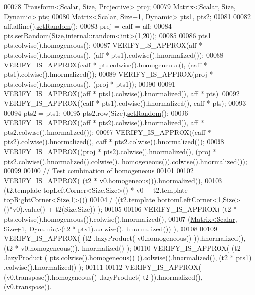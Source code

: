 \begin{DoxyCode}
00078   \hyperlink{group___geometry___module_class_eigen_1_1_transform}{Transform<Scalar, Size, Projective>} proj;
00079   \hyperlink{group___core___module_class_eigen_1_1_matrix}{Matrix<Scalar, Size, Dynamic>}   pts;
00080   \hyperlink{group___core___module_class_eigen_1_1_matrix}{Matrix<Scalar, Size+1, Dynamic>} pts1, pts2;
00081 
00082   aff.affine().\hyperlink{class_eigen_1_1_plain_object_base_af0e576a0e1aefc9ee346de44cc352ba3}{setRandom}();
00083   proj = caff = aff;
00084   pts.\hyperlink{class_eigen_1_1_plain_object_base_af0e576a0e1aefc9ee346de44cc352ba3}{setRandom}(Size,internal::random<int>(1,20));
00085   
00086   pts1 = pts.colwise().homogeneous();
00087   VERIFY\_IS\_APPROX(aff  * pts.colwise().homogeneous(), (aff  * pts1).colwise().hnormalized());
00088   VERIFY\_IS\_APPROX(caff * pts.colwise().homogeneous(), (caff * pts1).colwise().hnormalized());
00089   VERIFY\_IS\_APPROX(proj * pts.colwise().homogeneous(), (proj * pts1));
00090 
00091   VERIFY\_IS\_APPROX((aff  * pts1).colwise().hnormalized(),  aff  * pts);
00092   VERIFY\_IS\_APPROX((caff * pts1).colwise().hnormalized(), caff * pts);
00093   
00094   pts2 = pts1;
00095   pts2.row(Size).\hyperlink{class_eigen_1_1_plain_object_base_af0e576a0e1aefc9ee346de44cc352ba3}{setRandom}();
00096   VERIFY\_IS\_APPROX((aff  * pts2).colwise().hnormalized(), aff  * pts2.colwise().hnormalized());
00097   VERIFY\_IS\_APPROX((caff * pts2).colwise().hnormalized(), caff * pts2.colwise().hnormalized());
00098   VERIFY\_IS\_APPROX((proj * pts2).colwise().hnormalized(), (proj * pts2.colwise().hnormalized().colwise().
      homogeneous()).colwise().hnormalized());
00099   
00100   \textcolor{comment}{// Test combination of homogeneous}
00101   
00102   VERIFY\_IS\_APPROX( (t2 * v0.homogeneous()).hnormalized(),
00103                        (t2.template topLeftCorner<Size,Size>() * v0 + t2.template topRightCorner<Size,1>())
00104                      / ((t2.template bottomLeftCorner<1,Size>()*v0).value() + t2(Size,Size)) );
00105   
00106   VERIFY\_IS\_APPROX( (t2 * pts.colwise().homogeneous()).colwise().hnormalized(),
00107                     (\hyperlink{group___core___module_class_eigen_1_1_matrix}{Matrix<Scalar, Size+1, Dynamic>}(t2 * pts1).colwise().
      hnormalized()) );
00108   
00109   VERIFY\_IS\_APPROX( (t2 .lazyProduct( v0.homogeneous() )).hnormalized(), (t2 * v0.homogeneous()).
      hnormalized() );
00110   VERIFY\_IS\_APPROX( (t2 .lazyProduct  ( pts.colwise().homogeneous() )).colwise().hnormalized(), (t2 * pts1)
      .colwise().hnormalized() );
00111   
00112   VERIFY\_IS\_APPROX( (v0.transpose().homogeneous() .lazyProduct( t2 )).hnormalized(), (v0.transpose().

\end{DoxyCode}
